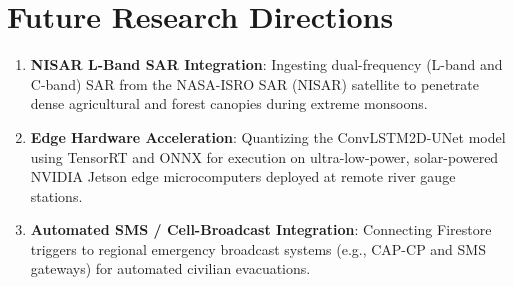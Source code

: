 \documentclass[12pt,a4paper,oneside]{report}
\begin{document}
\section{Future Research Directions}
\begin{enumerate}
    \item \textbf{NISAR L-Band SAR Integration}: Ingesting dual-frequency (L-band and C-band) SAR from the NASA-ISRO SAR (NISAR) satellite to penetrate dense agricultural and forest canopies during extreme monsoons.
    \item \textbf{Edge Hardware Acceleration}: Quantizing the ConvLSTM2D-UNet model using TensorRT and ONNX for execution on ultra-low-power, solar-powered NVIDIA Jetson edge microcomputers deployed at remote river gauge stations.
    \item \textbf{Automated SMS / Cell-Broadcast Integration}: Connecting Firestore triggers to regional emergency broadcast systems (e.g., CAP-CP and SMS gateways) for automated civilian evacuations.
\end{enumerate}
\end{document}
